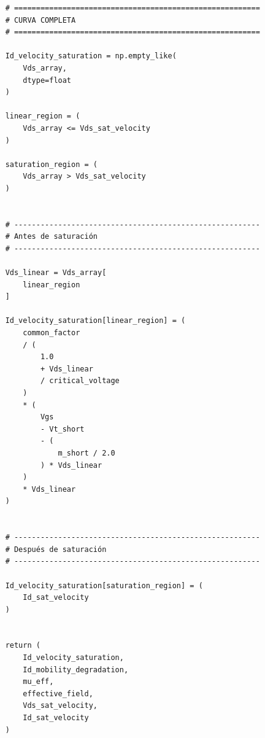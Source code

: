 \documentclass[a4paper, twoside, 10pt, spanish]{article}
\numberwithin{table}{section}
\begin{document}
\begin{verbatim}
    # ========================================================
    # CURVA COMPLETA
    # ========================================================

    Id_velocity_saturation = np.empty_like(
        Vds_array,
        dtype=float
    )

    linear_region = (
        Vds_array <= Vds_sat_velocity
    )

    saturation_region = (
        Vds_array > Vds_sat_velocity
    )


    # --------------------------------------------------------
    # Antes de saturación
    # --------------------------------------------------------

    Vds_linear = Vds_array[
        linear_region
    ]

    Id_velocity_saturation[linear_region] = (
        common_factor
        / (
            1.0
            + Vds_linear
            / critical_voltage
        )
        * (
            Vgs
            - Vt_short
            - (
                m_short / 2.0
            ) * Vds_linear
        )
        * Vds_linear
    )


    # --------------------------------------------------------
    # Después de saturación
    # --------------------------------------------------------

    Id_velocity_saturation[saturation_region] = (
        Id_sat_velocity
    )


    return (
        Id_velocity_saturation,
        Id_mobility_degradation,
        mu_eff,
        effective_field,
        Vds_sat_velocity,
        Id_sat_velocity
    )
\end{verbatim}
\end{document}
